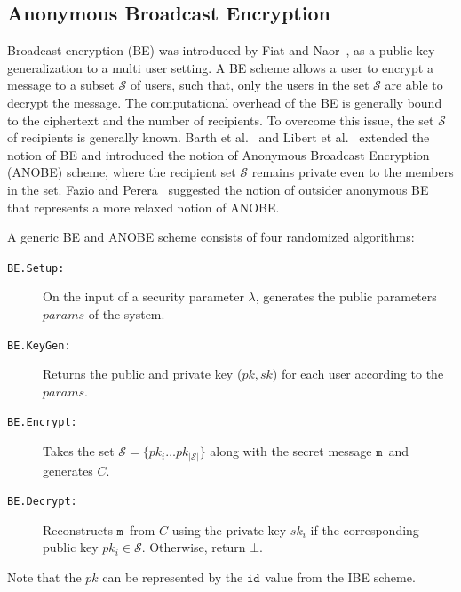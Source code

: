 \documentclass{llncs}
\newcommand{\msg}{\ensuremath{\mathtt{m}}}
\newcommand{\id}[1]{\ensuremath{\mathtt{id}_{#1}}}
\begin{document}
\subsection{Anonymous Broadcast Encryption}
Broadcast encryption (BE) was introduced by Fiat and Naor~\cite{FiatBE}, as a public-key generalization to a multi user setting. A BE scheme allows a user to encrypt a message to a subset $\mathcal{S}$ of users, such that, only the users in the set $\mathcal{S}$ are able to decrypt the message. The computational overhead of the BE is generally bound to the ciphertext and the number of recipients. To overcome this issue, the set $\mathcal{S}$ of recipients is generally known. Barth et al.~\cite{BarthBonehWaters} and Libert et al.~\cite{LibertANOBE} extended the notion of BE and introduced the notion of Anonymous Broadcast Encryption (ANOBE) scheme, where the recipient set $\mathcal{S}$ remains private even to the members in the set. Fazio and Perera~\cite{FazioOutsiderANOBE} suggested the notion of outsider anonymous BE that represents a more relaxed notion of ANOBE.  

A generic BE and ANOBE scheme consists of four randomized algorithms:
\begin{description}
    \item[\texttt{BE.Setup:}] On the input of a security parameter $\lambda$, generates the public parameters $params$ of the system.
    \item[\texttt{BE.KeyGen:}] Returns the public and private key ($pk,sk$) for each user according to the $params$.
    \item[\texttt{BE.Encrypt:}] Takes the set $\mathcal{S}=\{pk_i \ldots pk_{|\mathcal{S}|}\}$ along with the secret message \msg\ and generates $C$.
    \item[\texttt{BE.Decrypt:}] Reconstructs \msg\ from $C$ using the private key $sk_i$ if the corresponding public key $pk_i \in \mathcal{S}$. Otherwise, return $\bot$.
\end{description}

Note that the $pk$ can be represented by the \id{} value from the IBE scheme. 
\end{document}

